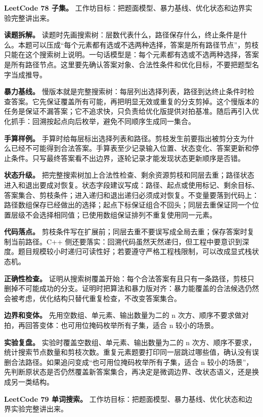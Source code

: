 \noindent\textbf{LeetCode 78 子集。} 工作坊目标：把题面模型、暴力基线、优化状态和边界实验完整讲出来。

\textbf{读题拆解。} 读题时先画搜索树：层数代表什么，路径保存什么，终止条件是什么。本题可以压成“每个元素都有选或不选两种选择，答案是所有路径节点”，剪枝只能在这个搜索树上说明。一句话模型是：每个元素都有选或不选两种选择，答案是所有路径节点。这里要先确认答案对象、合法性条件和优化目标，不要把题型名字当成推导。

\textbf{暴力基线。} 慢版本就是完整搜索树：每层列出选择列表，路径到达终止条件时检查答案。它先保证覆盖所有可能，再把明显无效或重复的分支剪掉。这个慢版本的任务是保证不漏答案；它不追求快，只负责给优化版提供对拍基准。随后再引入优化抓手：回溯按起点向后枚举，避免不同顺序生成同一集合。

\textbf{手算样例。} 手算时给每层标出选择列表和路径。剪枝发生前要指出被剪分支为什么已经不可能得到合法答案。手算表至少记录输入位置、状态变化、答案更新和停止条件。只写最终答案看不出边界，逐轮记录才能发现状态更新顺序是否错。

\textbf{状态升级。} 把完整搜索树加上合法性检查、剩余资源剪枝和同层去重；路径状态进入和退出要成对恢复。状态字段建议写成：路径、起点或使用标记、剩余目标、答案集合、剪枝条件；进入递归和退出递归必须成对恢复。不变量要落到代码上：路径数组保存已经做出的选择；起点下标保证组合不回头；同层去重保证同一个位置层级不会选择相同值；已使用数组保证排列不重复使用同一元素。

\textbf{代码落点。} 剪枝条件写在扩展前；同层去重不要误写成全局去重；保存答案时复制当前路径。C++ 侧还要落实：回溯代码虽然天然递归，但工程中要意识到深度。题目规模较小时递归可读性好；若要遵守严格工程栈限制，可以改成显式栈状态机。

\textbf{正确性检查。} 证明从搜索树覆盖开始：每个合法答案有且只有一条路径，剪枝只删掉不可能成功的分支。证明时把算法和暴力版对齐：暴力能覆盖的合法候选仍然会被考虑，优化结构只替代重复检查，不改变答案集合。

\textbf{边界和变体。} 先用空数组、单元素、输出数量为二的 n 次方、顺序不要求做对拍，再回答变体：也可用位掩码枚举所有子集，适合 n 较小的场景。

\textbf{实验复盘。} 实验时覆盖空数组、单元素、输出数量为二的 n 次方、顺序不要求，统计搜索节点数量和剪枝次数。重复元素题要打印同一层跳过哪些值，确认没有误删合法路径。如果追问变成“也可用位掩码枚举所有子集，适合 n 较小的场景”，先判断原状态是否仍然覆盖新答案集合，再决定是微调边界、改状态语义，还是换成另一类结构。

\noindent\textbf{LeetCode 79 单词搜索。} 工作坊目标：把题面模型、暴力基线、优化状态和边界实验完整讲出来。

